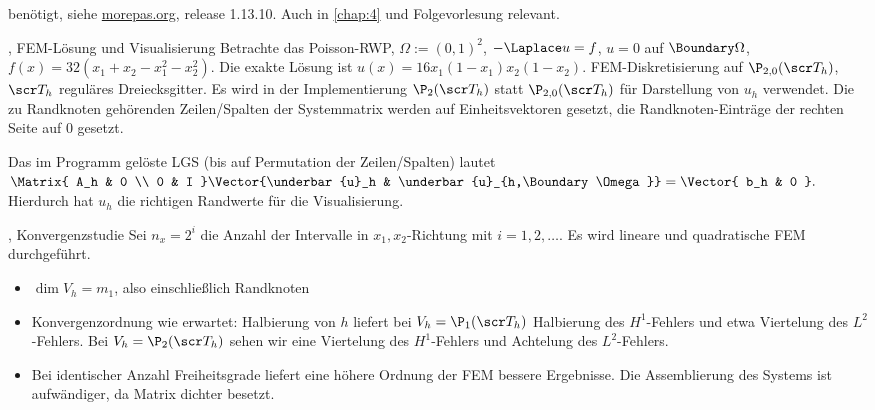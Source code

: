 \begin{ex*}
	 benötigt, siehe \url{morepas.org}, release 1.13.10.
	Auch in \ref{chap:4} und Folgevorlesung relevant.

	\begin{seg}{, FEM-Lösung und Visualisierung}
		Betrachte das Poisson-RWP, $\Omega := (0,1)^2$, $-\Laplace u = f$, $u = 0$ auf $\Boundary \Omega$,
		\begin{math}
			f(x) = 32(x_1 + x_2 - x_1^2 - x_2^2).
		\end{math}
		Die exakte Lösung ist $u(x) = 16 x_1(1-x_1) x_2(1-x_2)$.
		FEM-Diskretisierung auf $\P_{2,0}(\scr T_h)$, $\scr T_h$ reguläres Dreiecksgitter.
		Es wird in der Implementierung $\P_2(\scr T_h)$ statt $\P_{2,0}(\scr T_h)$ für Darstellung von $u_h$ verwendet.
		Die zu Randknoten gehörenden Zeilen/Spalten der Systemmatrix werden auf Einheitsvektoren gesetzt, die Randknoten-Einträge der rechten Seite auf $0$ gesetzt.

		Das im Programm gelöste LGS (bis auf Permutation der Zeilen/Spalten) lautet
		\begin{math}
			\Matrix{ A_h & 0 \\ 0 & I }
			\Vector{\underbar{u}_h & \underbar{u}_{h,\Boundary \Omega}}
			= \Vector{ b_h & 0 }.
		\end{math}
		Hierdurch hat $u_h$ die richtigen Randwerte für die Visualisierung.
	\end{seg}
	\begin{seg}{, Konvergenzstudie}
		Sei $n_x = 2^i$ die Anzahl der Intervalle in $x_1, x_2$-Richtung mit $i= 1,2, \dotsc$.
		Es wird lineare und quadratische FEM durchgeführt.
		\begin{itemize}
			\item
				$\dim V_h = m_1$, also einschließlich Randknoten
			\item
				Konvergenzordnung wie erwartet:
				Halbierung von $h$ liefert bei $V_h = \P_1(\scr T_h)$ Halbierung des $H^1$-Fehlers und etwa Viertelung des $L^2$-Fehlers.
				Bei $V_h = \P_2(\scr T_h)$ sehen wir eine Viertelung des $H^1$-Fehlers und Achtelung des $L^2$-Fehlers.
			\item
				Bei identischer Anzahl Freiheitsgrade liefert eine höhere Ordnung der FEM bessere Ergebnisse.
				Die Assemblierung des Systems ist aufwändiger, da Matrix dichter besetzt.
		\end{itemize}
	\end{seg}
\end{ex*}

